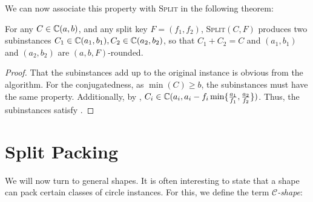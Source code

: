 \documentclass[a4paper,style=print,bibliography=totoc,nexus,lnum,extramargin]{tubsbook}
\begin{document}
We can now associate this property with \textsc{Split} in the following theorem:

\begin{theorem}\label{th:split-sets}
    For any $C \in \mathbb{C}(a,b)$, and any split key $F = (f_1, f_2)$, \textsc{Split}$(C,F)$ produces two subinstances $C_1 \in \mathbb{C}(a_1, b_1), C_2 \in \mathbb{C}(a_2, b_2)$, so that $C_1 + C_2 = C$ and $(a_1, b_1)$ and $(a_2, b_2)$ are $(a,b,F)$-rounded.
\end{theorem}

\begin{proof}
    That the subinstances add up to the original instance is obvious from the algorithm.
    For the conjugatedness, as $\min(C) \ge b$, the subinstances must have the same property. Additionally, by , $C_i \in \mathbb{C}(a_i, a_i - f_i \min\{\frac{a_1}{f_1}, \frac{a_2}{f_2}\})$. Thus, the subinstances satisfy .
\end{proof}



\section{Split Packing}

We will now turn to general shapes. It is often interesting to state that a shape can pack certain classes of circle instances. For this, we define the term \emph{$\mathcal{C}$-shape}:
\end{document}
